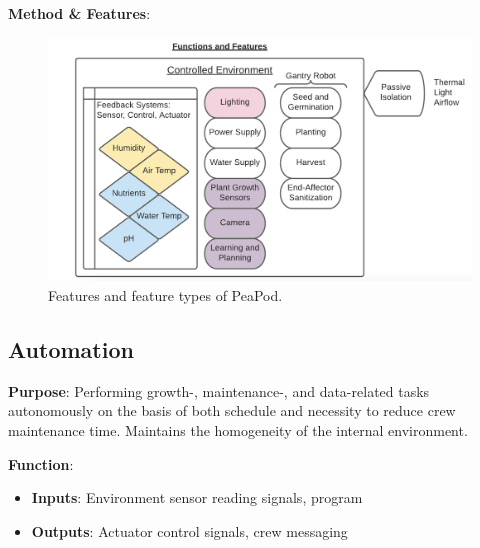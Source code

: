 \documentclass{report}
\begin{document}
\textbf{Method \& Features}: 

\begin{figure}[h]
    \centering
    \includegraphics[width=12cm]{images/features.png}
    \hfill
    \caption{Features and feature types of PeaPod.}
\end{figure}

\newpage

\subsection{Automation}
\label{sec:automation}

\textbf{Purpose}: Performing growth-, maintenance-, and data-related tasks autonomously on the basis of both schedule and necessity to reduce crew maintenance time. Maintains the homogeneity of the internal environment.

\textbf{Function}:
\begin{itemize}
    \item \textbf{Inputs}: Environment sensor reading signals, program
    \item \textbf{Outputs}: Actuator control signals, crew messaging
\end{itemize}
\end{document}
